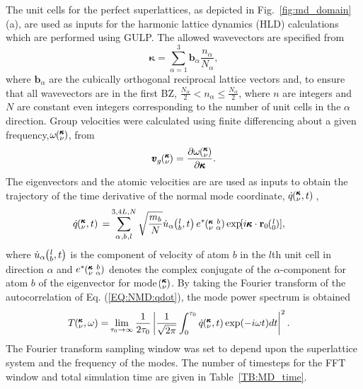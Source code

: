 \documentclass[aps,prb,preprint,preprintnumbers,amsmath,amssymb,floatfix,superscriptaddress]{revtex4}
\newcommand{\EXP}[1]{\exp\mspace{-5.0mu}\left[#1\right]\mspace{-3.0mu}}
\newcommand{\SUM}[2]{\ifthenelse{\equal{#1}{0}}{\sum_{
\alpha_{#2},b_{#2},l_{#2}}^{3,4L,N}} {\ifthenelse{\equal{#1}{1}}{\sum_{
\alpha_{#2},b_{#2}}^{3,n}}{\sum_{\pmb{\kappa}#2,\nu#2}^{N,3n}}}}
\newcommand{\ab}[2]{\mspace{-4.0mu}\left(\mspace{-8.0mu}
\begin{smallmatrix}&\ifthenelse{\equal{#1}{}}{a}{#1} \\&\ifthenelse
{\equal{#2}{}}{b}{#2}\end{smallmatrix}\mspace{-3.0mu}\right)}
\newcommand{\kvba}{\mspace{-4.0mu}\left(\mspace{-8.0mu}
\begin{smallmatrix} &\pmb{\kappa} &b \\ &\nu &\alpha\end{smallmatrix}
\mspace{-3.0mu}\right)}
\newcommand{\kvt}{\mspace{-4.0mu}\left(\mspace{-8.0mu}
\begin{smallmatrix}&\pmb{\kappa} \\&\nu\end{smallmatrix}
\mspace{-2.0mu},t\right)}
\newcommand{\kvw}{\mspace{-4.0mu}\left(\mspace{-8.0mu}
\begin{smallmatrix}&\pmb{\kappa} \\&\nu\end{smallmatrix}
\mspace{-2.0mu},\omega\right)}
\newcommand{\kv}{\mspace{-4.0mu}\left(\mspace{-8.0mu}
\begin{smallmatrix}&\pmb{\kappa} \\&\nu\end{smallmatrix}
\mspace{-3.0mu}\right)}
\newcommand{\lbt}{\mspace{-4.0mu}\left(\mspace{-8.0mu}
\begin{smallmatrix}&l \\&b\end{smallmatrix}\mspace{-2.0mu},t\right)}
\begin{document}
The unit cells for the perfect superlattices, as depicted in Fig.~\ref{fig:md_domain}(a), are used as inputs for the harmonic lattice dynamics (HLD) calculations which are performed using GULP.\cite{GULP} The allowed wavevectors are specified from
\begin{equation}\label{EQ:NMD:allowdkpt}
\pmb{\kappa} = \sum_{\alpha=1}^3 \pmb{b}_{\alpha} \frac{n_{\alpha}}{N_{\alpha}},
\end{equation}
where $\pmb{b}_\alpha$ are the cubically orthogonal reciprocal lattice vectors and, to ensure that all wavevectors are in the first BZ, $ \frac{N_\alpha}{2} < n_\alpha \le \frac {N_\alpha}{2}$, where $n$ are integers and $N$ are constant even integers corresponding to the number of unit cells in the $\alpha$ direction. Group velocities were calculated using finite differencing about a given frequency,$\omega \kv$, from \cite{ziman_electrons_2001}
\begin{equation}\label{EQ:NMD:vg}
\begin{split}
\pmb{v}_{g}\kv=\frac{\partial \omega \kv}{\partial \pmb{\kappa}}.
\end{split}
\end{equation}
The eigenvectors and the atomic velocities are are used as inputs to obtain the trajectory of the time derivative of the normal mode coordinate, $\dot{q}\kvt{}{}{}$, 
\begin{equation}\label{EQ:NMD:qdot}
\begin{split}
\dot{q}\kvt{}{}{}=&\SUM{0}{}\sqrt{\frac{m_b}{N}}\dot{u}_{\alpha}\lbt e^*\kvba\EXP{i\pmb{\kappa}\cdot\mathbf{r}_0\ab{l}{0}},
\end{split}
\end{equation}
where $\dot{u}_{\alpha}\lbt$ is the component of velocity of atom $b$ in the $l$th unit cell in direction $\alpha$ and $e^*\kvba$ denotes the complex conjugate of the $\alpha$-component for atom $b$ of the eigenvector for mode $\kv$. By taking the Fourier transform of the autocorrelation of Eq. (\ref{EQ:NMD:qdot}), the mode power spectrum is obtained \cite{dove_introduction_1993-3}
\begin{equation}\label{EQ:NMD:SED}
\begin{split}
T\kvw=&\lim_{\tau_0\rightarrow\infty}\frac{1}{2\tau_0}\left|\frac{1}{\sqrt{2\pi}}\int_{0}^{\tau_0}\dot{q}\kvt\exp(-i\omega t)dt\right|^2.
\end{split}
\end{equation}
The Fourier transform sampling window was set to depend upon the superlattice system and the frequency of the modes. The number of timesteps for the FFT window and total simulation time are given in Table~\ref{TB:MD_time}.
\end{document}
